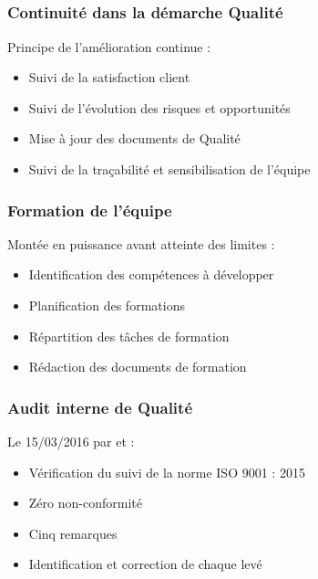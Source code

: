 
\speaker{\Pierre}

\subsection{} %


\begin{frame}
\frametitle{Continuité dans la démarche Qualité}
Principe de l'amélioration continue :
\begin{itemize}
\item Suivi de la satisfaction client
\item Suivi de l'évolution des risques et opportunités
\item Mise à jour des documents de Qualité
\item Suivi de la traçabilité et sensibilisation de l'équipe
\end{itemize}
\end{frame}


\begin{frame}
\frametitle{Formation de l'équipe}
Montée en puissance avant atteinte des limites :
\begin{itemize}
\item Identification des compétences à développer
\item Planification des formations
\item Répartition des tâches de formation
\item Rédaction des documents de formation
\end{itemize}
\end{frame}


\begin{frame}
\frametitle{Audit interne de Qualité}
Le 15/03/2016 par \nomApprobateur{} et \nomTuteurQualite{} :
\begin{itemize}
\item Vérification du suivi de la norme ISO 9001 : 2015
\item Zéro non-conformité
\item Cinq remarques
\item Identification et correction de chaque \FT{} levé
\end{itemize}
\end{frame}





